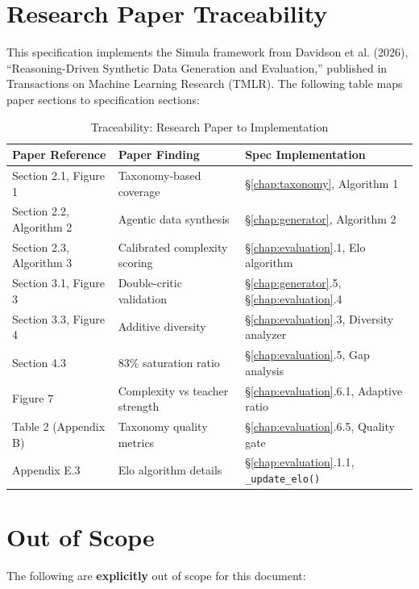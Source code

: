 \documentclass[12pt,a4paper,twoside]{report}
\begin{document}
\section{Research Paper Traceability}

This specification implements the Simula framework from Davidson et al. (2026),
``Reasoning-Driven Synthetic Data Generation and Evaluation,'' published in
Transactions on Machine Learning Research (TMLR). The following table maps
paper sections to specification sections:

\begin{table}[H]
\centering
\caption{Traceability: Research Paper to Implementation}
\label{tab:traceability}
\begin{tabularx}{\textwidth}{p{3.5cm}p{4cm}X}
\toprule
\textbf{Paper Reference} & \textbf{Paper Finding} & \textbf{Spec Implementation} \\
\midrule
Section 2.1, Figure 1 & Taxonomy-based coverage & §\ref{chap:taxonomy}, Algorithm 1 \\
Section 2.2, Algorithm 2 & Agentic data synthesis & §\ref{chap:generator}, Algorithm 2 \\
Section 2.3, Algorithm 3 & Calibrated complexity scoring & §\ref{chap:evaluation}.1, Elo algorithm \\
Section 3.1, Figure 3 & Double-critic validation & §\ref{chap:generator}.5, §\ref{chap:evaluation}.4 \\
Section 3.3, Figure 4 & Additive diversity & §\ref{chap:evaluation}.3, Diversity analyzer \\
Section 4.3 & 83\% saturation ratio & §\ref{chap:evaluation}.5, Gap analysis \\
Figure 7 & Complexity vs teacher strength & §\ref{chap:evaluation}.6.1, Adaptive ratio \\
Table 2 (Appendix B) & Taxonomy quality metrics & §\ref{chap:evaluation}.6.5, Quality gate \\
Appendix E.3 & Elo algorithm details & §\ref{chap:evaluation}.1.1, \texttt{\_update\_elo()} \\
\bottomrule
\end{tabularx}
\end{table}

\section{Out of Scope}

The following are \textbf{explicitly} out of scope for this document:
\end{document}
